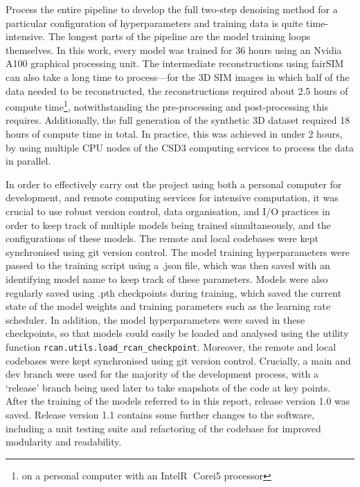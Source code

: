 \documentclass[12pt]{article}
\begin{document}
Process the entire pipeline to develop the full two-step denoising method for a particular configuration of hyperparameters and training data is quite time-intensive.
The longest parts of the pipeline are the model training loops themselves.
In this work, every model was trained for 36 hours using an Nvidia A100 graphical processing unit.
The intermediate reconstructions using fairSIM can also take a long time to process---for the 3D SIM images in which half of the data needed to be reconstructed,
the reconstructions required about 2.5 hours of compute time\footnote{on a personal computer with an Intel\textcircled{R} Core\texttrademark i5 processor},
notwithstanding the pre-processing and post-processing this requires.
Additionally, the full generation of the synthetic 3D dataset required 18 hours of compute time in total.
In practice, this was achieved in under 2 hours, by using multiple CPU nodes of the CSD3 computing services to process the data in parallel.

In order to effectively carry out the project using both a personal computer for development,
and remote computing services for intensive computation,
it was crucial to use robust version control, data organisation, and I/O practices in order to keep track of multiple models being trained simultaneously,
and the configurations of these models.
The remote and local codebases were kept synchronised using git version control.
The model training hyperparameters were passed to the training script using a .json file,
which was then saved with an identifying model name to keep track of these parameters.
Models were also regularly saved using .pth checkpoints during training,
which saved the current state of the model weights and training parameters such as the learning rate scheduler.
In addition, the model hyperparameters were saved in these checkpoints,
so that models could easily be loaded and analysed using the utility function \texttt{rcan.utils.load\_rcan\_checkpoint}.
Moreover, the remote and local codebases were kept synchronised using git version control.
Crucially, a main and dev branch were used for the majority of the development process,
with a `release' branch being used later to take snapshots of the code at key points.
After the training of the models referred to in this report,
release version 1.0 was saved.
Release version 1.1 contains some further changes to the software,
including a unit testing suite and refactoring of the codebase for improved modularity and readability.
\end{document}
